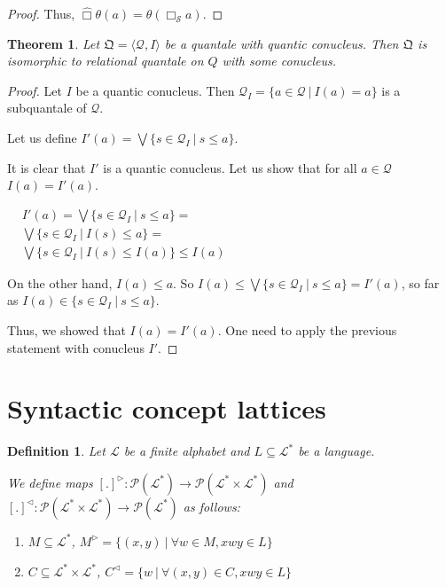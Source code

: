 \documentclass[a4paper]{article}
\theoremstyle{defin}
\newtheorem{defin}{Definition}
\theoremstyle{theorem}
\newtheorem{theorem}{Theorem}
\theoremstyle{prop}
\theoremstyle{lemma}
\theoremstyle{ex}
\theoremstyle{col}
\begin{document}
\begin{proof}
Thus, $\hat{\Box} \theta(a) = \theta(\Box_{\mathcal{S}} a)$.

\end{proof}

\begin{theorem}
  Let $\mathfrak{Q} = \langle \mathcal{Q}, I \rangle$ be a quantale with
  quantic conucleus. Then $\mathfrak{Q}$ is isomorphic to relational quantale on $Q$ with some conucleus.
\end{theorem}

\begin{proof}
  Let $I$ be a quantic conucleus. Then $\mathcal{Q}_{I} = \{ a \in \mathcal{Q} \: | \: I(a) = a \}$ is a subquantale of $\mathcal{Q}$.

  Let us define $I'(a) = \bigvee \{ s \in \mathcal{Q}_{I} \: | \: s \leq a \}$.

  It is clear that $I'$ is a quantic conucleus. Let us show that for all
  $a \in \mathcal{Q}$ $I(a) = I'(a)$.

  $\begin{array}{lll}
  & I'(a) = \bigvee \{ s \in \mathcal{Q}_{I} \: | \: s \leq a \} = & \\
  & \bigvee \{ s \in \mathcal{Q}_{I} \: | \: I(s) \leq a \} = & \\
  & \bigvee \{ s \in \mathcal{Q}_{I} \: | \: I(s) \leq I(a) \} \leq I(a)&
  \end{array}$

  On the other hand, $I(a) \leq a$. So $I(a) \leq \bigvee \{ s \in \mathcal{Q}_{I} \: | \: s \leq a \} = I'(a)$, so far as $I(a) \in \{ s \in \mathcal{Q}_{I} \: | \: s \leq a \}$.

  Thus, we showed that $I(a) = I'(a)$. One need to apply the previous statement with conucleus $I'$.
\end{proof}

\section{Syntactic concept lattices}

\begin{defin}
  Let $\mathcal{L}$ be a finite alphabet and $L \subseteq \mathcal{L}^{*}$ be a language.

  We define maps $[.]^{\triangleright} : \mathcal{P}(\mathcal{L}^{*}) \to \mathcal{P}(\mathcal{L}^{*} \times \mathcal{L}^{*})$
  and $[.]^{\triangleleft} : \mathcal{P}(\mathcal{L}^{*} \times \mathcal{L}^{*}) \to \mathcal{P}(\mathcal{L}^{*})$ as follows:

  \begin{enumerate}
    \item $M \subseteq \mathcal{L}^{*}$, $M^{\triangleright} = \{ (x, y) \: | \: \forall w \in M, x w y \in L \}$
    \item $C \subseteq \mathcal{L}^{*} \times \mathcal{L}^{*}$, $C^{\triangleleft} = \{ w \: | \: \forall (x, y) \in C, x w y
    \in L\}$
  \end{enumerate}
\end{defin}
\end{document}
